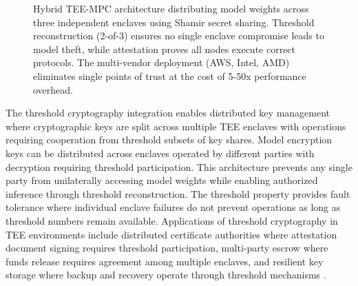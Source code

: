 \begin{figure}[htbp]
\caption{Hybrid TEE-MPC architecture distributing model weights across three independent enclaves using Shamir secret sharing. Threshold reconstruction (2-of-3) ensures no single enclave compromise leads to model theft, while attestation proves all nodes execute correct protocols. The multi-vendor deployment (AWS, Intel, AMD) eliminates single points of trust at the cost of 5-50x performance overhead.}
\label{fig:tee_mpc_hybrid}
\end{figure}

The threshold cryptography integration enables distributed key management where cryptographic keys are split across multiple TEE enclaves with operations requiring cooperation from threshold subsets of key shares. Model encryption keys can be distributed across enclaves operated by different parties with decryption requiring threshold participation. This architecture prevents any single party from unilaterally accessing model weights while enabling authorized inference through threshold reconstruction. The threshold property provides fault tolerance where individual enclave failures do not prevent operations as long as threshold numbers remain available. Applications of threshold cryptography in TEE environments include distributed certificate authorities where attestation document signing requires threshold participation, multi-party escrow where funds release requires agreement among multiple enclaves, and resilient key storage where backup and recovery operate through threshold mechanisms \cite{threshold_crypto}.


